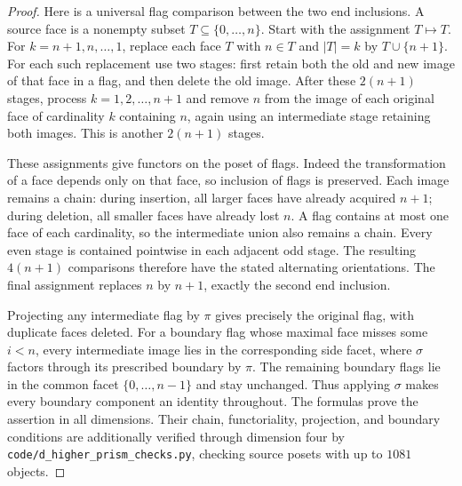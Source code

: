 \begin{proof}
Here is a universal flag comparison between the two end inclusions. A source face is a nonempty subset $T\subseteq\{0,\ldots,n\}$. Start with the assignment $T\mapsto T$. For $k=n+1,n,\ldots,1$, replace each face $T$ with $n\in T$ and $|T|=k$ by $T\cup\{n+1\}$. For each such replacement use two stages: first retain both the old and new image of that face in a flag, and then delete the old image. After these $2(n+1)$ stages, process $k=1,2,\ldots,n+1$ and remove $n$ from the image of each original face of cardinality $k$ containing $n$, again using an intermediate stage retaining both images. This is another $2(n+1)$ stages.

These assignments give functors on the poset of flags. Indeed the transformation of a face depends only on that face, so inclusion of flags is preserved. Each image remains a chain: during insertion, all larger faces have already acquired $n+1$; during deletion, all smaller faces have already lost $n$. A flag contains at most one face of each cardinality, so the intermediate union also remains a chain. Every even stage is contained pointwise in each adjacent odd stage. The resulting $4(n+1)$ comparisons therefore have the stated alternating orientations. The final assignment replaces $n$ by $n+1$, exactly the second end inclusion.

Projecting any intermediate flag by $\pi$ gives precisely the original flag, with duplicate faces deleted. For a boundary flag whose maximal face misses some $i<n$, every intermediate image lies in the corresponding side facet, where $\sigma$ factors through its prescribed boundary by $\pi$. The remaining boundary flags lie in the common facet $\{0,\ldots,n-1\}$ and stay unchanged. Thus applying $\sigma$ makes every boundary component an identity throughout. The formulas prove the assertion in all dimensions. Their chain, functoriality, projection, and boundary conditions are additionally verified through dimension four by \texttt{code/d\_higher\_prism\_checks.py}, checking source posets with up to $1081$ objects.
\end{proof}

